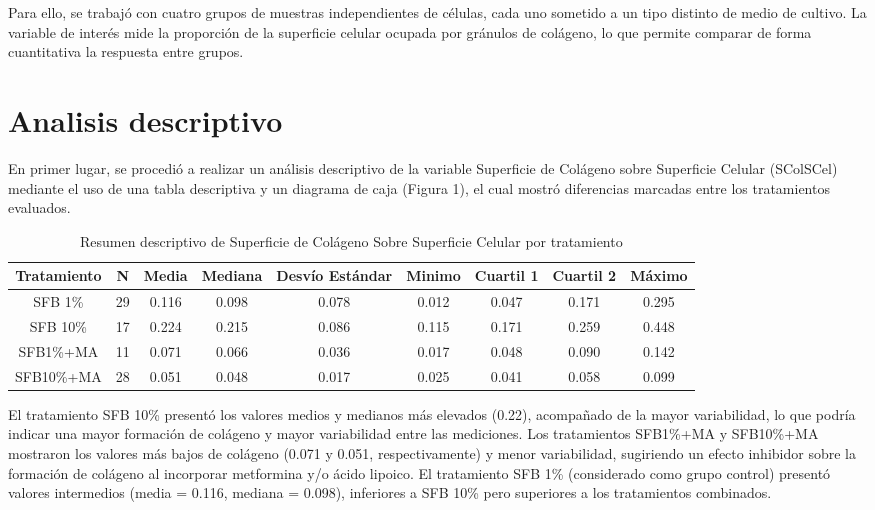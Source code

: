 \documentclass[
  11pt,
]{article}
\begin{document}
Para ello, se trabajó con cuatro grupos de muestras independientes de
células, cada uno sometido a un tipo distinto de medio de cultivo. La
variable de interés mide la proporción de la superficie celular ocupada
por gránulos de colágeno, lo que permite comparar de forma cuantitativa
la respuesta entre grupos.

\section{Analisis descriptivo}\label{analisis-descriptivo}

En primer lugar, se procedió a realizar un análisis descriptivo de la
variable Superficie de Colágeno sobre Superficie Celular (SColSCel)
mediante el uso de una tabla descriptiva y un diagrama de caja (Figura
1), el cual mostró diferencias marcadas entre los tratamientos
evaluados.

\begin{longtable}[t]{ccccccccc}
\caption{\label{tab:unnamed-chunk-3}Resumen descriptivo de Superficie de Colágeno Sobre Superficie Celular por tratamiento}\\
\toprule
Tratamiento & N & Media & Mediana & Desvío Estándar & Minimo & Cuartil 1 & Cuartil 2 & Máximo\\
\midrule
SFB 1\% & 29 & 0.116 & 0.098 & 0.078 & 0.012 & 0.047 & 0.171 & 0.295\\
SFB 10\% & 17 & 0.224 & 0.215 & 0.086 & 0.115 & 0.171 & 0.259 & 0.448\\
SFB1\%+MA & 11 & 0.071 & 0.066 & 0.036 & 0.017 & 0.048 & 0.090 & 0.142\\
SFB10\%+MA & 28 & 0.051 & 0.048 & 0.017 & 0.025 & 0.041 & 0.058 & 0.099\\
\bottomrule
\end{longtable}

El tratamiento SFB 10\% presentó los valores medios y medianos más
elevados (0.22), acompañado de la mayor variabilidad, lo que podría
indicar una mayor formación de colágeno y mayor variabilidad entre las
mediciones. Los tratamientos SFB1\%+MA y SFB10\%+MA mostraron los
valores más bajos de colágeno (0.071 y 0.051, respectivamente) y menor
variabilidad, sugiriendo un efecto inhibidor sobre la formación de
colágeno al incorporar metformina y/o ácido lipoico. El tratamiento SFB
1\% (considerado como grupo control) presentó valores intermedios (media
= 0.116, mediana = 0.098), inferiores a SFB 10\% pero superiores a los
tratamientos combinados.
\end{document}
